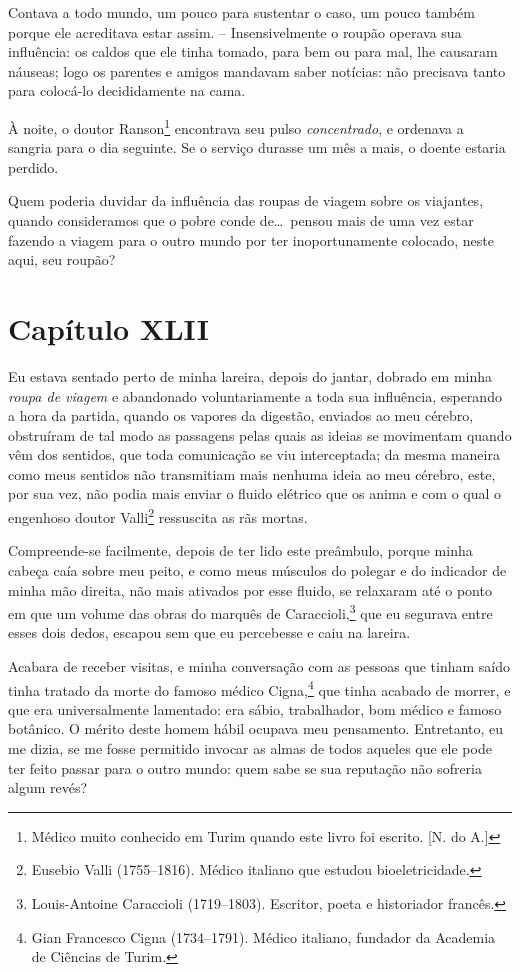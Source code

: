 Contava a todo mundo, um pouco para sustentar o caso, um pouco também
porque ele acreditava estar assim. -- Insensivelmente o roupão operava
sua influência: os caldos que ele tinha tomado, para bem ou para mal,
lhe causaram náuseas; logo os parentes e amigos mandavam saber
notícias: não precisava tanto para colocá-lo decididamente na cama. 

 À noite, o doutor Ranson\footnote{ Médico muito conhecido em Turim
quando este livro foi escrito. [N. do A.]} encontrava seu pulso
\textit{concentrado}, e ordenava a sangria para o dia seguinte. Se o
serviço durasse um mês a mais, o doente estaria perdido.

 Quem poderia duvidar da influência das roupas de viagem sobre os
viajantes, quando consideramos que o pobre conde de\ldots\ pensou mais de
uma vez estar fazendo a viagem para o outro mundo por ter
inoportunamente colocado, neste aqui, seu roupão?

\section*{Capítulo XLII}

 Eu estava sentado perto de minha lareira, depois do jantar, dobrado em
minha \textit{roupa de viagem} e abandonado voluntariamente a toda sua
influência, esperando a hora da partida, quando os vapores da digestão,
enviados ao meu cérebro, obstruíram de tal modo as passagens pelas
quais as ideias se movimentam quando vêm dos sentidos, que toda
comunicação se viu interceptada; da mesma maneira como meus sentidos
não transmitiam mais nenhuma ideia ao meu cérebro, este, por sua vez,
não podia mais enviar o fluido elétrico que os anima e com o qual o
engenhoso doutor Valli\footnote{ Eusebio Valli (1755--1816). Médico
italiano que estudou bioeletricidade.} ressuscita as rãs mortas. 

Compreende-se facilmente, depois de ter lido este preâmbulo, porque
minha cabeça caía sobre meu peito, e como meus músculos do polegar e do
indicador de minha mão direita, não mais ativados por esse fluido, se
relaxaram até o ponto em que um volume das obras do marquês de
Caraccioli,\footnote{ Louis-Antoine Caraccioli (1719--1803). Escritor,
poeta e historiador francês.} que eu segurava entre esses dois
dedos, escapou sem que eu percebesse e caiu na lareira. 

Acabara de receber visitas, e minha conversação com as pessoas que
tinham saído tinha tratado da morte do famoso médico Cigna,\footnote{ Gian 
Francesco Cigna (1734--1791). Médico italiano, fundador da Academia
de Ciências de Turim.} que tinha acabado de morrer, e que era
universalmente lamentado: era sábio, trabalhador, bom médico e famoso
botânico. O mérito deste homem hábil ocupava meu pensamento.
Entretanto, eu me dizia, se me fosse permitido invocar as almas de
todos aqueles que ele pode ter feito passar para o outro mundo: quem
sabe se sua reputação não sofreria algum revés?

